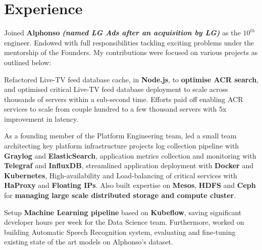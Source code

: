 \documentclass[]{deedy-resume-openfont}
\begin{document}
\begin{minipage}[t]{0.66\textwidth} 


\section{Experience}
\vspace{\topsep} %
\begin{tightemize}
\item Joined \textbf{Alphonso} {\footnotesize \textit{\textbf{(named LG Ads after an acquisition by LG) }}} as the $10^{th}$ engineer. Endowed with full responsibilities tackling exciting problems under the mentorship of the Founders. My contributions were focused on various projects as outlined below:
\item Refactored Live-TV feed database cache, in \textbf{Node.js}, to \textbf{optimise ACR search}, and optimised critical Live-TV feed database deployment to scale across thousands of servers within a sub-second time. Efforts paid off enabling ACR services to scale from couple hundred to a few thousand servers with 5x improvement in latency.
\item As a founding member of the Platform Engineering team, led a small team architecting key platform infrastructure projects \textemdash log collection pipeline with \textbf{Graylog} and \textbf{ElasticSearch}, application metrics collection and monitoring with \textbf{Telegraf} and \textbf{InfluxDB}, streamlined application deployment with \textbf{Docker} and \textbf{Kubernetes}, High-availability and Load-balancing of critical services with \textbf{HaProxy} and \textbf{Floating IPs}. Also built expertise on \textbf{Mesos}, \textbf{HDFS} and \textbf{Ceph} for \textbf{managing large scale distributed storage and compute cluster}.
\item Setup \textbf{Machine Learning pipeline} based on \textbf{Kubeflow}, saving significant developer hours per week for the Data Science team. Furthermore, worked on building Automatic Speech Recognition system, evaluating and fine-tuning existing
state of the art models on Alphonso's dataset.
\end{tightemize}
\sectionsep


\end{minipage}
\end{document}
